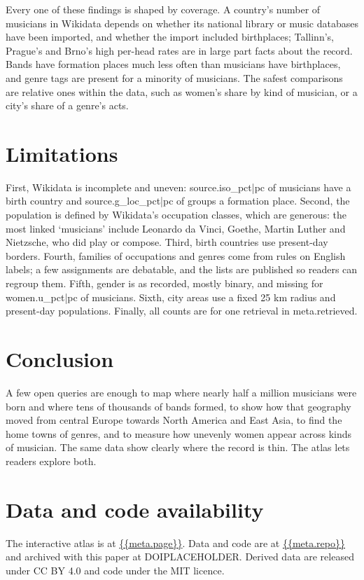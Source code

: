 \documentclass[11pt,a4paper]{article}
\begin{document}
Every one of these findings is shaped by coverage. A country's number of musicians in Wikidata depends on whether its national library or music databases have been imported, and whether the import included birthplaces; Tallinn's, Prague's and Brno's high per-head rates are in large part facts about the record. Bands have formation places much less often than musicians have birthplaces, and genre tags are present for a minority of musicians. The safest comparisons are relative ones within the data, such as women's share by kind of musician, or a city's share of a genre's acts.

\section{Limitations}
First, Wikidata is incomplete and uneven: {{source.iso_pct|pc}} of musicians have a birth country and {{source.g_loc_pct|pc}} of groups a formation place. Second, the population is defined by Wikidata's occupation classes, which are generous: the most linked `musicians' include Leonardo da Vinci, Goethe, Martin Luther and Nietzsche, who did play or compose. Third, birth countries use present-day borders. Fourth, families of occupations and genres come from rules on English labels; a few assignments are debatable, and the lists are published so readers can regroup them. Fifth, gender is as recorded, mostly binary, and missing for {{women.u_pct|pc}} of musicians. Sixth, city areas use a fixed 25 km radius and present-day populations. Finally, all counts are for one retrieval in {{meta.retrieved}}.

\section{Conclusion}
A few open queries are enough to map where nearly half a million musicians were born and where tens of thousands of bands formed, to show how that geography moved from central Europe towards North America and East Asia, to find the home towns of genres, and to measure how unevenly women appear across kinds of musician. The same data show clearly where the record is thin. The atlas lets readers explore both.

\section*{Data and code availability}
The interactive atlas is at \url{{{meta.page}}}. Data and code are at \url{{{meta.repo}}} and archived with this paper at DOIPLACEHOLDER. Derived data are released under CC BY 4.0 and code under the MIT licence.
\end{document}
